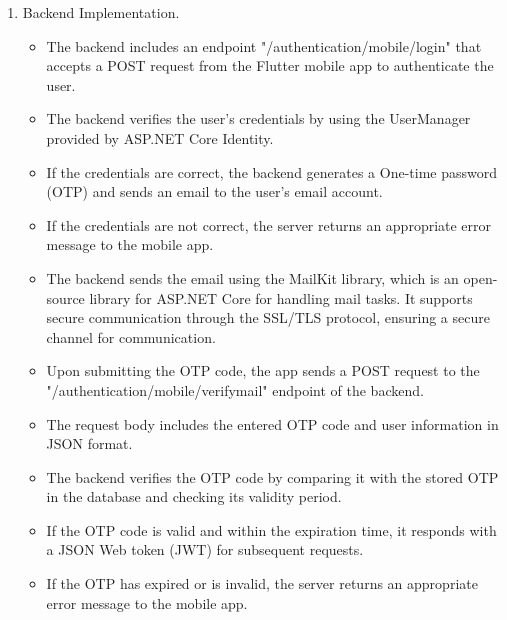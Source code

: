 \documentclass[
12pt,
oneside, 
onehalfspacing, 
nolistspacing, 
parskip, 
chapterinoneline, 
]{AASTCOMPUTER}
\begin{document}
\begin{enumerate}
\item Backend Implementation.
\begin{itemize}
\item The backend includes an endpoint "/authentication/mobile/login" that accepts a POST request from the Flutter mobile app to authenticate the user.
\item The backend verifies the user's credentials by using the UserManager provided by ASP.NET Core Identity.
\item If the credentials are correct, the backend generates a One-time password (OTP) and sends an email to the user's email account.
\item If the credentials are not correct, the server returns an appropriate error message to the mobile app.
\item The backend sends the email using the MailKit library, which is an open-source library for ASP.NET Core for handling mail tasks. It supports secure communication through the SSL/TLS protocol, ensuring a secure channel for communication.
\item Upon submitting the OTP code, the app sends a POST request to the "/authentication/mobile/verifymail" endpoint of the backend.
\item The request body includes the entered OTP code and user information in JSON format.
\item The backend verifies the OTP code by comparing it with the stored OTP in the database and checking its validity period.
\item If the OTP code is valid and within the expiration time, it responds with a JSON Web token (JWT) for subsequent requests.
\item If the OTP has expired or is invalid, the server returns an appropriate error message to the mobile app.
\end{itemize}
\end{enumerate}
\end{document}
